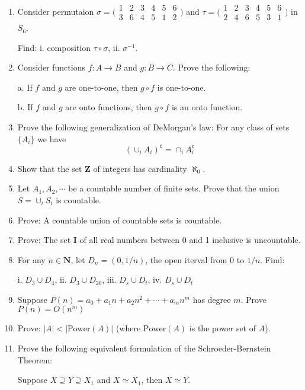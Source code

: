 \documentclass{article}
\begin{document}
\begin{enumerate}
  \item Consider permutaion
  $\sigma = \bigl(\begin{smallmatrix}
    1 & 2 & 3 & 4 & 5 & 6 \\ 3 & 6 & 4 & 5 & 1 & 2
    \end{smallmatrix} \bigr)$
  and $\tau = \bigl(\begin{smallmatrix}
    1 & 2 & 3 & 4 & 5 & 6 \\ 2 & 4 & 6 & 5 & 3 & 1
    \end{smallmatrix} \bigr)$ in $S_6$.

    Find: i. composition $\tau \circ \sigma$, ii. $\sigma^{-1}$.

    \item Consider functions $f: A\to B$ and $g: B\to C$. Prove the following:

    a. If $f$ and $g$ are one-to-one, then $g\circ f$ is one-to-one.

    b. If $f$ and $g$ are onto functions, then $g\circ f$ is an onto function.

    \item Prove the following generalization of DeMorgan's law: For any class of sets $\{A_i\}$ we have
    $$
    (\cup_i A_i)^\mathsf{c} = \cap_i A_i^\mathsf{c}
    $$

    \item Show that the set $\textbf{Z}$ of integers has cardinality $\aleph_0$.

    \item Let $A_1, A_2, \cdots$ be a countable number of finite sets.
    Prove that the union $S = \cup_i S_i$ is countable.

    \item Prove: A countable union of countable sets is countable.

    \item Prove: The set $\textbf{I}$ of all real numbers between 0 and 1 inclusive is uncountable.

    \item For any $n \in \textbf{N}$, let $D_n = (0, 1/n)$, the open iterval from $0$ to $1/n$. Find:

    i. $D_3 \cup D_4$, ii. $D_3 \cup D_20$, iii. $D_s \cup D_t$, iv. $D_s \cup D_t$

    \item Suppose $P(n) = a_0 + a_1 n + a_2 n^2 + \cdots + a_m n^m$ has degree $m$. Prove $P(n) = O(n^m)$

    \item Prove: $|A| < |\textrm{Power}(A)|$ (where $\textrm{Power}(A)$ is the power set of $A$).

    \item Prove the following equivalent formulation of the Schroeder-Bernstein Theorem:

    Suppose $X\supseteq Y \supseteq X_1$ and $X\simeq X_1$, then $X\simeq Y$.

  \end{enumerate}
\end{document}
